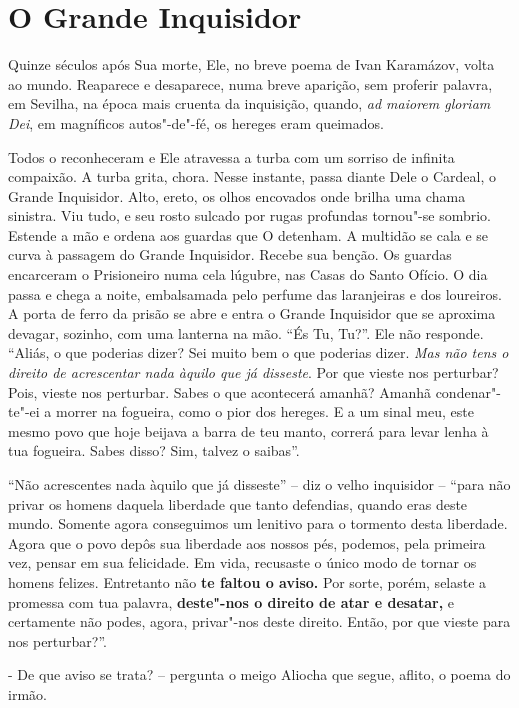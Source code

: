 \section{O Grande Inquisidor}

Quinze séculos após Sua morte, Ele, no breve poema de Ivan Karamázov,
volta ao mundo. Reaparece e desaparece, numa breve aparição, sem
proferir palavra, em Sevilha, na época mais cruenta da inquisição,
quando, \emph{ad maiorem gloriam Dei}, em magníficos autos"-de"-fé, os
hereges eram queimados.

Todos o reconheceram e Ele atravessa a turba com um sorriso de infinita
compaixão. A turba grita, chora. Nesse instante, passa diante Dele o
Cardeal, o Grande Inquisidor. Alto, ereto, os olhos encovados onde
brilha uma chama sinistra. Viu tudo, e seu rosto sulcado por rugas
profundas tornou"-se sombrio. Estende a mão e ordena aos guardas que O
detenham. A multidão se cala e se curva à passagem do Grande Inquisidor.
Recebe sua benção. Os guardas encarceram o Prisioneiro numa cela
lúgubre, nas Casas do Santo Ofício. O dia passa e chega a noite,
embalsamada pelo perfume das laranjeiras e dos loureiros. A porta de
ferro da prisão se abre e entra o Grande Inquisidor que se aproxima
devagar, sozinho, com uma lanterna na mão. ``És Tu, Tu?''. Ele não
responde. ``Aliás, o que poderias dizer? Sei muito bem o que poderias
dizer. \emph{Mas não tens o direito de acrescentar nada àquilo que já
disseste}. Por que vieste nos perturbar? Pois, vieste nos perturbar.
Sabes o que acontecerá amanhã? Amanhã condenar"-te"-ei a morrer na
fogueira, como o pior dos hereges. E a um sinal meu, este mesmo povo que
hoje beijava a barra de teu manto, correrá para levar lenha à tua
fogueira. Sabes disso? Sim, talvez o saibas''.

``Não acrescentes nada àquilo que já disseste'' -- diz o velho
inquisidor -- ``para não privar os homens daquela liberdade que tanto
defendias, quando eras deste mundo. Somente agora conseguimos um
lenitivo para o tormento desta liberdade. Agora que o povo depôs sua
liberdade aos nossos pés, podemos, pela primeira vez, pensar em sua
felicidade. Em vida, recusaste o único modo de tornar os homens felizes.
Entretanto não \textbf{te faltou o aviso.} Por sorte, porém, selaste a
promessa com tua palavra, \textbf{deste"-nos o direito de atar e
desatar,} e certamente não podes, agora, privar"-nos deste direito.
Então, por que vieste para nos perturbar?''.

- De que aviso se trata? -- pergunta o meigo Aliocha que segue, aflito,
o poema do irmão.

